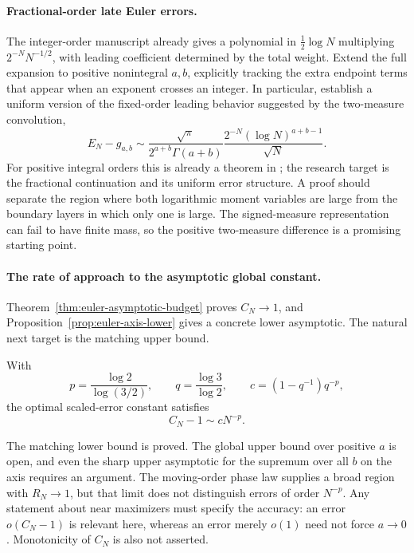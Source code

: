 \paragraph{Fractional-order late Euler errors.}
The integer-order manuscript already gives a polynomial in
$\tfrac12\log N$ multiplying $2^{-N}N^{-1/2}$, with leading
coefficient determined by the total weight. Extend the full
expansion to positive nonintegral $a,b$, explicitly tracking
the extra endpoint terms that appear when an exponent crosses
an integer. In particular, establish a uniform version of the
fixed-order leading behavior suggested by the two-measure
convolution,
\[
 E_N-g_{a,b}\sim
 \frac{\sqrt{\pi}}{2^{a+b}\Gamma(a+b)}
 \frac{2^{-N}(\log N)^{a+b-1}}{\sqrt N}.
\]
For positive integral orders this is already a theorem in
; the research target is
the fractional continuation and its uniform error structure.
A proof should separate the region where both logarithmic
moment variables are large from the boundary layers in which
only one is large. The signed-measure representation can fail
to have finite mass, so the positive two-measure difference
is a promising starting point.

\paragraph{The rate of approach to the asymptotic global constant.}
Theorem~\ref{thm:euler-asymptotic-budget} proves $C_N\to1$, and
Proposition~\ref{prop:euler-axis-lower} gives a concrete lower
asymptotic. The natural next target is the matching upper bound.

\begin{conjecture}
\label{conj:euler-rate}
With
\[
 p=\frac{\log2}{\log(3/2)},\qquad
 q=\frac{\log3}{\log2},\qquad c=(1-q^{-1})q^{-p},
\]
the optimal scaled-error constant satisfies
\[
 C_N-1\sim cN^{-p}.
\]
\end{conjecture}

The matching lower bound is proved. The global upper bound over
positive $a$ is open, and even the sharp upper asymptotic for
the supremum over all $b$ on the axis requires an argument.
The moving-order phase law supplies a broad region with $R_N\to1$,
but that limit does not distinguish errors of order $N^{-p}$.
Any statement about near maximizers must specify the accuracy:
an error $o(C_N-1)$ is relevant here, whereas an error merely
$o(1)$ need not force $a\to0$. Monotonicity of $C_N$ is also
not asserted.

